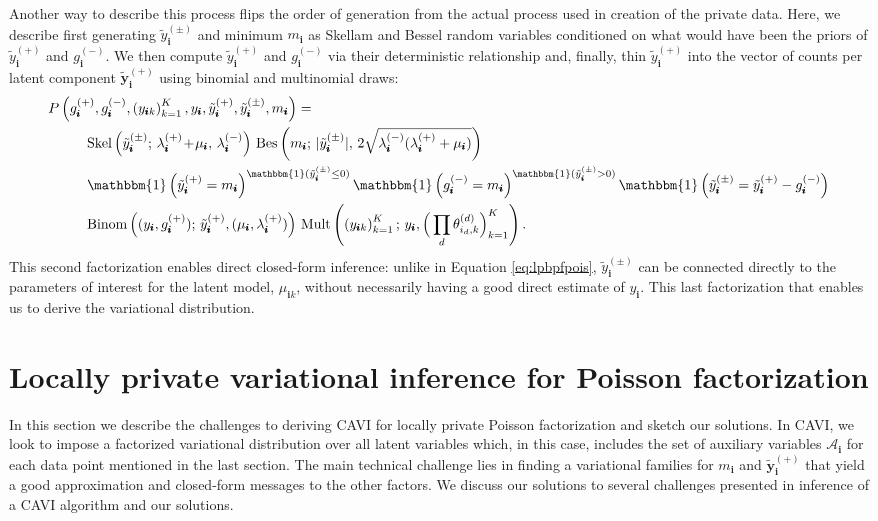 \documentclass{article}
\newcommand{\subs}{\pmb{i}}
\newcommand{\wsup}[2]{#1_{\subs}^{(#2)}}
\newcommand{\ytP}{\wsup{\tilde{y}}{+}}
\newcommand{\ytPM}{\wsup{\tilde{y}}{\pm}}
\newcommand{\ysk}{y_{\subs k}}
\newcommand{\ys}{y_{\subs}}
\newcommand{\lamP}{\wsup{\lambda}{+}}
\newcommand{\lamM}{\wsup{\lambda}{-}}
\newcommand{\gP}{\wsup{g}{+}}
\newcommand{\gM}{\wsup{g}{-}}
\newcommand{\musk}{\mu_{\subs k}}
\newcommand{\ms}{m_{\subs}}
\newcommand{\yvtP}{\boldsymbol{\tilde{y}}_{\subs}^{(+)}}
\newcommand{\tp}{\!+\!}
\begin{document}
Another way to describe this process flips the order of generation from the
actual process used in creation of the private data. Here, we describe first
generating $\ytPM$ and minimum $\ms$ as Skellam and Bessel random variables
conditioned on what would have been the priors of $\ytP$ and $\gM$. We then
compute $\ytP$ and $\gM$ via their deterministic relationship and, finally, thin
$\ytP$ into the vector of counts per latent component $\yvtP$ using binomial and
multinomial draws:
\begin{align}
    P &\left(\gP, \gM, \left(\ysk\right)_{k=1}^K, \ys,
    \ytP, \ytPM, \ms\right) = \notag \\
  &\quad\quad \text{Skel}\left(\ytPM;\, \lamP \tp \mu_{\subs},\, \lamM\right)\, \text{Bes}\left(\ms;\, |\ytPM|,\,2\sqrt{\lamM(\lamP+\mu_{\subs})}\right)\notag\\
  &\quad\quad \mathbbm{1} \left(\ytP=\ms\right)^{\mathbbm{1}(\ytPM \leq 0)} \mathbbm{1} \left(\gM=\ms\right)^{\mathbbm{1}(\ytPM > 0)} \mathbbm{1}\left(\ytPM = \ytP - \gM\right)\notag\\
  &\quad\quad \text{Binom}\left((\ys, \gP);\, \ytP, (\mu_{\subs}, \lamP)\right) \,  \text{Mult}\left(\left(\ysk\right)_{k=1}^K;\, \ys, \Big( \prod_d \theta_{i_d,k}^{(d)} \Big)_{k=1}^K\right).
\label{eqn:finalfact}
\end{align}
This second factorization enables direct closed-form inference: unlike in
  Equation \ref{eq:lpbpfpois}, $\ytPM$ can be connected directly to the
  parameters of interest for the latent model, $\musk$, without necessarily
  having a good direct estimate of $\ys$. This last factorization that
  enables us to derive the variational distribution.

  
  \section{Locally private variational inference for Poisson factorization}
  In this section we describe the challenges to deriving CAVI for locally
  private Poisson factorization and sketch our solutions. In CAVI, we look to
  impose a factorized variational distribution over all latent variables which,
  in this case, includes the set of auxiliary variables $\mathcal{A}_{\subs}$
  for each data point mentioned in the last section. The main technical
  challenge lies in finding a variational families for $\ms$ and $\yvtP$ that
  yield a good approximation and closed-form messages to the other factors. We
  discuss our solutions to several challenges presented in inference of a CAVI
  algorithm and our solutions.~
   
\end{document}
